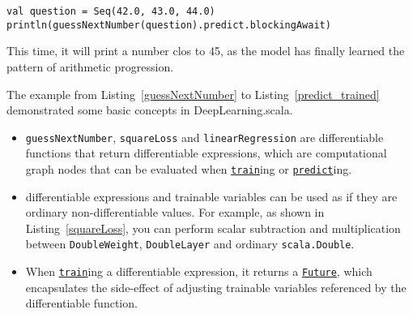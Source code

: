 \begin{lstlisting}[float={h t b p},caption={Inference on a trained model},label={predict_trained}]
val question = Seq(42.0, 43.0, 44.0)
println(guessNextNumber(question).predict.blockingAwait)
\end{lstlisting}

This time, it will print a number clos to 45, as the model has finally learned the pattern of arithmetic progression.

The example from Listing~\ref{guessNextNumber} to Listing~\ref{predict_trained} demonstrated some basic concepts in DeepLearning.scala.

\begin{itemize}
  \item \lstinline{guessNextNumber}, \lstinline{squareLoss} and \lstinline{linearRegression} are \glspl{differentiable function} that return \glspl{differentiable expression}, which are \gls{computational graph} nodes that can be evaluated when \href{https://javadoc.io/page/com.thoughtworks.deeplearning/deeplearning_2.11/latest/com/thoughtworks/deeplearning/DeepLearning.html#train(differentiable:Differentiable)(implicitmonoid:algebra.ring.MultiplicativeMonoid[DeepLearning.this.Delta]):com.thoughtworks.future.Future[DeepLearning.this.Data]}{\lstinline{train}}ing or \href{https://javadoc.io/page/com.thoughtworks.deeplearning/deeplearning_2.11/latest/com/thoughtworks/deeplearning/DeepLearning.html#predict(differentiable:Differentiable):com.thoughtworks.future.Future[DeepLearning.this.Data]}{\lstinline{predict}}ing.
  \item \Glspl{differentiable expression} and \glspl{trainable variable} can be used as if they are ordinary non-differentiable values. For example, as shown in Listing~\ref{squareLoss}, you can perform scalar subtraction and multiplication between \lstinline{DoubleWeight}, \lstinline{DoubleLayer} and ordinary \lstinline{scala.Double}.
  \item When \href{https://javadoc.io/page/com.thoughtworks.deeplearning/deeplearning_2.11/latest/com/thoughtworks/deeplearning/DeepLearning.html#train(differentiable:Differentiable)(implicitmonoid:algebra.ring.MultiplicativeMonoid[DeepLearning.this.Delta]):com.thoughtworks.future.Future[DeepLearning.this.Data]}{\lstinline{train}}ing a \gls{differentiable expression}, it returns a \href{https://javadoc.io/page/com.thoughtworks.future/future_2.11/latest/com/thoughtworks/future%24%24Future.html}{\lstinline{Future}}, which encapsulates the side-effect of adjusting \glspl{trainable variable} referenced by the \gls{differentiable function}.

\end{itemize}
